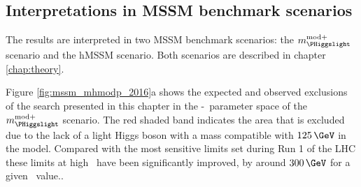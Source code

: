 \subsection{Interpretations in MSSM benchmark scenarios}
\label{sec:mssm_results_modeldep}
The results are interpreted in two MSSM benchmark scenarios: the $m_{\text{\PHiggslight}}^{\text{mod+}}$
scenario and the hMSSM scenario. Both scenarios are described in chapter \ref{chap:theory}.

Figure \ref{fig:mssm_mhmodp_2016}a shows the expected and
observed exclusions of the search presented in this chapter
in the \mA-\tanb~parameter space of the $m_{\PHiggslight}^{\text{mod+}}$ scenario. The red shaded band
indicates the area that is excluded due to the lack of a light Higgs boson with a mass compatible
with $125\,\GeV$ in the model. Compared with the most sensitive limits set during Run 1 of the \ac{LHC} these
limits at high \tanb~have been significantly improved, by around $300\,\GeV$ for a given \tanb~value..

